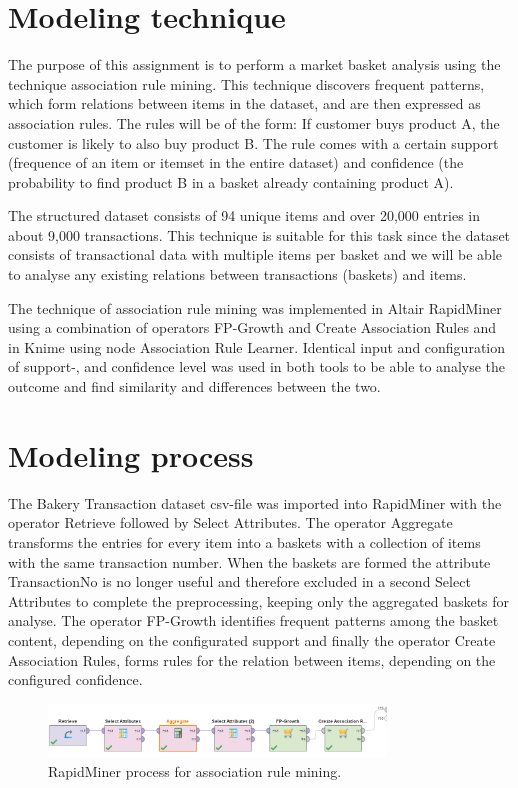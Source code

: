 \label{chap:modeling}

\section{Modeling technique}
The purpose of this assignment is to perform a market basket analysis using the technique
association rule mining. This technique discovers frequent patterns, which form relations
between items in the dataset, and are then expressed as association rules. The rules will
be of the form: If customer buys product A, the customer is likely to also buy product B.
The rule comes with a certain support (frequence of an item or itemset in the entire dataset)
and confidence (the probability to find product B in a basket already containing product A).

The structured dataset consists of 94 unique items and over 20,000 entries in about 9,000 transactions.
This technique is suitable for this task since the dataset consists of transactional data with
multiple items per basket and we will be able to analyse any existing relations between
transactions (baskets) and items. 

The technique of association rule mining was implemented in Altair RapidMiner using a combination
of operators FP-Growth and Create Association Rules and in Knime using node Association Rule Learner.
Identical input and configuration of support-, and confidence level was used in both tools to be
able to analyse the outcome and find similarity and differences between the two.

\section{Modeling process}
The Bakery Transaction dataset csv-file was imported into RapidMiner with the operator Retrieve
followed by Select Attributes. The operator Aggregate transforms the entries for every item into
a baskets with a collection of items with the same transaction number. When the baskets are formed
the attribute TransactionNo is no longer useful and therefore excluded in a second Select Attributes
to complete the preprocessing, keeping only the aggregated baskets for analyse. The operator FP-Growth
identifies frequent patterns among the basket content, depending on the configurated support and
finally the operator Create Association Rules, forms rules for the relation between items, depending
on the configured confidence.

\begin{figure}[H]
\centering
\includegraphics[width=0.8\textwidth]{figures/AssociationRulesRapidMinerProcess.png}
\caption{RapidMiner process for association rule mining.}
\label{fig:AssociationRulesRapidMinerProcess}
\end{figure}

